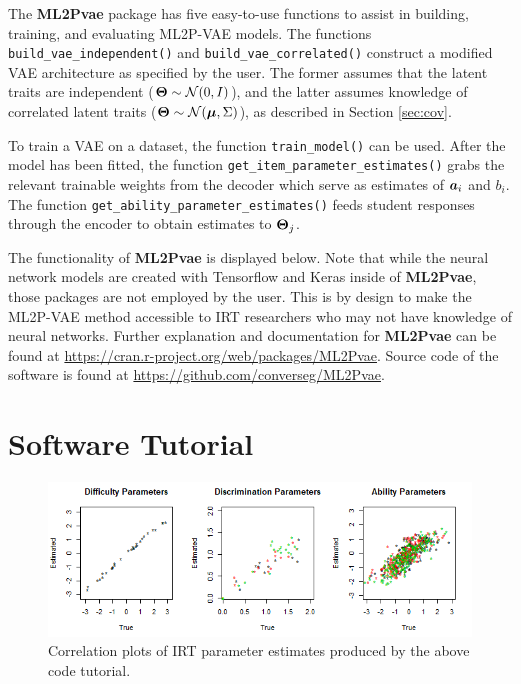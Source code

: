 The \textbf{ML2Pvae} package has five easy-to-use functions to assist in building, training, and evaluating ML2P-VAE models. The functions {\color{blue}\verb!build_vae_independent()!} and {\color{blue}\verb!build_vae_correlated()!} construct a modified VAE architecture as specified by the user. The former assumes that the latent traits are independent ($\boldsymbol{\Theta} \sim \mathcal{N}(0,I)$), and the latter assumes knowledge of correlated latent traits ($\boldsymbol{\Theta} \sim \mathcal{N}(\boldsymbol{\mu}, \Sigma)$), as described in Section \ref{sec:cov}.

To train a VAE on a dataset, the function {\color{blue}\verb!train_model()!} can be used. After the model has been fitted, the function {\color{blue}\verb!get_item_parameter_estimates()!} grabs the relevant trainable weights from the decoder which serve as estimates of $\boldsymbol{a}_i$ and $b_i$. The function {\color{blue}\verb!get_ability_parameter_estimates()!} feeds student responses through the encoder to obtain estimates to $\boldsymbol{\Theta}_j$.

The functionality of \textbf{ML2Pvae} is displayed below. Note that while the neural network models are created with Tensorflow and Keras \cite{keras_r} inside of \textbf{ML2Pvae}, those packages are not employed by the user. This is by design to make the ML2P-VAE method accessible to IRT researchers who may not have knowledge of neural networks. Further explanation and documentation for \textbf{ML2Pvae} can be found at {\color{violet}\href{https://cran.r-project.org/web/packages/ML2Pvae}{https://cran.r-project.org/web/packages/ML2Pvae}}. Source code of the software is found at {\color{violet}\href{https://github.com/converseg/ML2Pvae}{https://github.com/converseg/ML2Pvae}}.

\section{Software Tutorial}
\vspace{.5cm}


\begin{figure}[h]
  \centering
  \includegraphics[width=.95\textwidth]{img/ml2pvae_tutorial_plots.png}
  \caption{Correlation plots of IRT parameter estimates produced by the above code tutorial.}
  \label{fig:tutorial_plots}
\end{figure}


